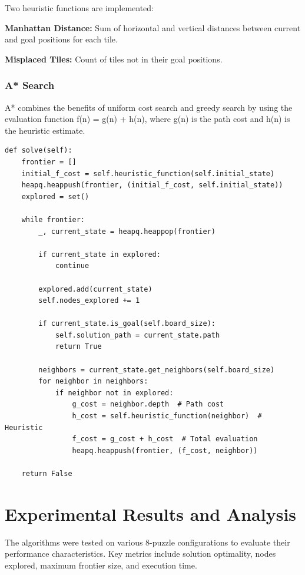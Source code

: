 \documentclass[11pt,a4paper]{article}
\begin{document}
Two heuristic functions are implemented:

\textbf{Manhattan Distance:} Sum of horizontal and vertical distances between current and goal positions for each tile.

\textbf{Misplaced Tiles:} Count of tiles not in their goal positions.

\subsubsection{A* Search}

A* combines the benefits of uniform cost search and greedy search by using the evaluation function f(n) = g(n) + h(n), where g(n) is the path cost and h(n) is the heuristic estimate.

\begin{lstlisting}[caption=A* Search with f(n) = g(n) + h(n)]
def solve(self):
    frontier = []
    initial_f_cost = self.heuristic_function(self.initial_state)
    heapq.heappush(frontier, (initial_f_cost, self.initial_state))
    explored = set()
    
    while frontier:
        _, current_state = heapq.heappop(frontier)
        
        if current_state in explored:
            continue
            
        explored.add(current_state)
        self.nodes_explored += 1
        
        if current_state.is_goal(self.board_size):
            self.solution_path = current_state.path
            return True
            
        neighbors = current_state.get_neighbors(self.board_size)
        for neighbor in neighbors:
            if neighbor not in explored:
                g_cost = neighbor.depth  # Path cost
                h_cost = self.heuristic_function(neighbor)  # Heuristic
                f_cost = g_cost + h_cost  # Total evaluation
                heapq.heappush(frontier, (f_cost, neighbor))
                
    return False
\end{lstlisting}

\section{Experimental Results and Analysis}

The algorithms were tested on various 8-puzzle configurations to evaluate their performance characteristics. Key metrics include solution optimality, nodes explored, maximum frontier size, and execution time.
\end{document}
